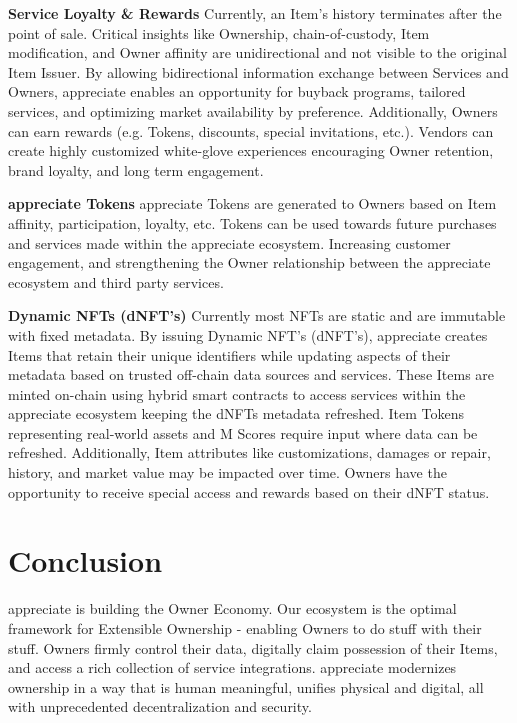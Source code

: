 \documentclass[a4paper,onecolumn, 10.5pt]{article}
\begin{document}
\textbf{Service Loyalty \& Rewards} \hfill \break
Currently, an Item’s history terminates after the point of sale. Critical insights like Ownership, chain-of-custody, Item modification, and Owner affinity are unidirectional and not visible to the original Item Issuer. By allowing bidirectional information exchange between Services and Owners, appreciate enables an opportunity for buyback programs, tailored services, and optimizing market availability by preference. Additionally, Owners can earn rewards (e.g. Tokens, discounts, special invitations, etc.). Vendors can create highly customized white-glove experiences encouraging Owner retention, brand loyalty, and long term engagement. 

\textbf{appreciate Tokens} \hfill \break
appreciate Tokens are generated to Owners based on Item affinity, participation, loyalty, etc. Tokens can be used towards future purchases and services made within the appreciate ecosystem. Increasing customer engagement, and strengthening the Owner relationship between the appreciate ecosystem and third party services.

\textbf{Dynamic NFTs (dNFT’s)} \hfill \break
Currently most NFTs are static and are immutable with fixed metadata. By issuing Dynamic NFT’s (dNFT’s), appreciate creates Items that retain their unique identifiers while updating aspects of their metadata based on trusted off-chain data sources and services. These Items are minted on-chain using hybrid smart contracts to access services within the appreciate ecosystem keeping the dNFTs metadata refreshed. Item Tokens representing real-world assets and M Scores require input where data can be refreshed. Additionally, Item attributes like customizations, damages or repair, history, and market value may be impacted over time. Owners have the opportunity to receive special access and rewards based on their dNFT status. 


\section{Conclusion}
appreciate is building the Owner Economy.  Our ecosystem is the optimal framework for Extensible Ownership - enabling Owners to do stuff with their stuff. Owners firmly control their data, digitally claim possession of their Items, and access a rich collection of service integrations. appreciate modernizes ownership in a way that is human meaningful, unifies physical and digital, all with unprecedented decentralization and security.
\end{document}
